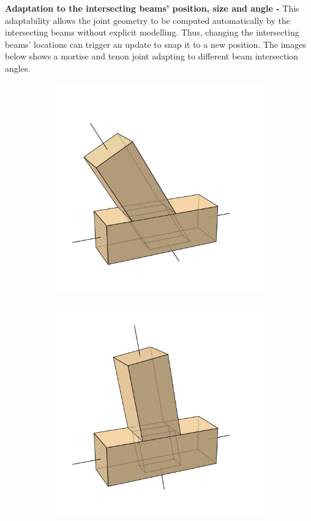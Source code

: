 \documentclass[11pt]{book}
\begin{document}
\textbf{Adaptation to the intersecting beams' position, size and angle -} This adaptability allows the joint geometry to be computed automatically by the intersecting beams without explicit modelling. Thus, changing the intersecting beams’ locations can trigger an update to snap it to a new position. The images below shows a mortise and tenon joint adapting to different beam intersection angles.

\begin{figure}[H]
\centering
\begin{subfigure}[b]{0.18\textwidth}
\centering
\includegraphics[width=\textwidth]{./images/image3.jpg}
\end{subfigure}
\hfill
\begin{subfigure}[b]{0.18\textwidth}
\centering
\includegraphics[width=\textwidth]{./images/image16.jpg}

\end{subfigure}
\end{figure}
\end{document}
